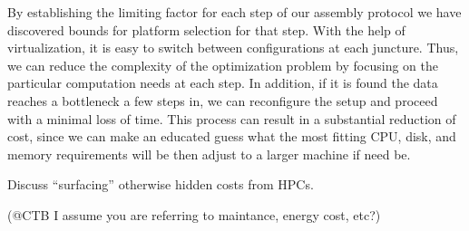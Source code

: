 By establishing the limiting factor for each step of our assembly protocol 
we have discovered bounds for platform selection for that step. With the help
of virtualization, it is easy to switch between configurations at each 
juncture. Thus, we can reduce the complexity of the optimization problem by 
focusing on the particular computation needs at each step. In addition, if it
is found the data reaches a bottleneck a few steps in, we can reconfigure the
setup and proceed with a minimal loss of time. This process can result in a 
substantial reduction of cost, since we can make an educated guess what the 
most fitting CPU, disk, and memory requirements will be then adjust to a larger
machine if need be.

Discuss ``surfacing'' otherwise hidden costs from HPCs.

(@CTB I assume you are referring to maintance, energy cost, etc?)


